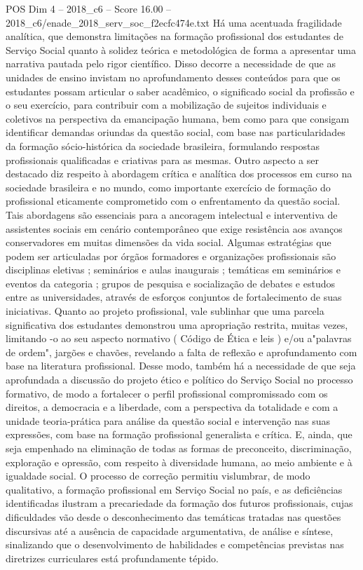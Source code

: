\begin{textsample}{POS Dim 4 – 2018\_c6 – Score 16.00 – 2018\_c6/enade\_2018\_serv\_soc\_f2ecfc474e.txt}
Há uma acentuada fragilidade analítica, que demonstra limitações na formação profissional dos estudantes de Serviço Social quanto à solidez teórica e metodológica de forma a apresentar uma narrativa pautada pelo rigor científico.
Disso decorre a necessidade de que as unidades de ensino invistam no aprofundamento desses conteúdos para que os estudantes possam articular o saber acadêmico, o significado social da profissão e o seu exercício, para contribuir com a mobilização de sujeitos individuais e coletivos na perspectiva da emancipação humana, bem como para que consigam identificar demandas oriundas da questão social, com base nas particularidades da formação sócio-histórica da sociedade brasileira, formulando respostas profissionais qualificadas e criativas para as mesmas.
Outro aspecto a ser destacado diz respeito à abordagem crítica e analítica dos processos em curso na sociedade brasileira e no mundo, como importante exercício de formação do profissional eticamente comprometido com o enfrentamento da questão social.
Tais abordagens são essenciais para a ancoragem intelectual e interventiva de assistentes sociais em cenário contemporâneo que exige resistência aos avanços conservadores em muitas dimensões da vida social.
Algumas estratégias que podem ser articuladas por órgãos formadores e organizações profissionais são disciplinas eletivas ; seminários e aulas inaugurais ; temáticas em seminários e eventos da categoria ; grupos de pesquisa e socialização de debates e estudos entre as universidades, através de esforços conjuntos de fortalecimento de suas iniciativas.
Quanto ao projeto profissional, vale sublinhar que uma parcela significativa dos estudantes demonstrou uma apropriação restrita, muitas vezes, limitando -o ao seu aspecto normativo ( Código de Ética e leis ) e/ou a"palavras de ordem", jargões e chavões, revelando a falta de reflexão e aprofundamento com base na literatura profissional.
Desse modo, também há a necessidade de que seja aprofundada a discussão do projeto ético e político do Serviço Social no processo formativo, de modo a fortalecer o perfil profissional compromissado com os direitos, a democracia e a liberdade, com a perspectiva da totalidade e com a unidade teoria-prática para análise da questão social e intervenção nas suas expressões, com base na formação profissional generalista e crítica.
E, ainda, que seja empenhado na eliminação de todas as formas de preconceito, discriminação, exploração e opressão, com respeito à diversidade humana, ao meio ambiente e à igualdade social.
O processo de correção permitiu vislumbrar, de modo qualitativo, a formação profissional em Serviço Social no país, e as deficiências identificadas ilustram a precariedade da formação dos futuros profissionais, cujas dificuldades vão desde o desconhecimento das temáticas tratadas nas questões discursivas até a ausência de capacidade argumentativa, de análise e síntese, sinalizando que o desenvolvimento de habilidades e competências previstas nas diretrizes curriculares está profundamente tépido.

\end{textsample}
